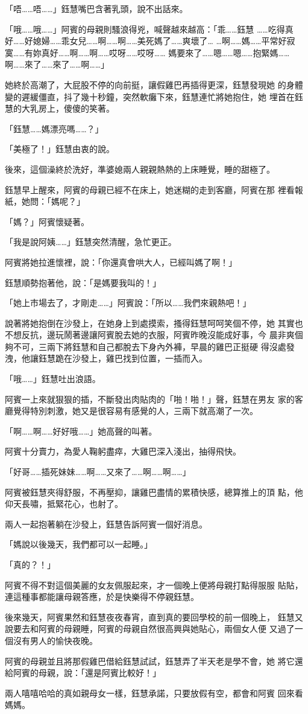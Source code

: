 「唔……唔……」鈺慧嘴巴含著乳頭，說不出話來。

「哦……哦……」阿賓的母親則騷浪得兇，喊聲越來越高：「乖……鈺慧
……吃得真好……好媳婦……乖女兒……啊……啊……美死媽了……爽壞了…
…啊……媽……平常好寂寞……有妳真好……啊……啊……哎呀……哎呀……
媽要來了……嗯……嗯……抱緊媽……啊……來了……來了……啊……」

她終於高潮了，大屁股不停的向前挺，讓假雞巴再插得更深，鈺慧發現她
的身體變的遲緩僵直，抖了幾十秒鐘，突然軟癱下來，鈺慧連忙將她抱住，她
埋首在鈺慧的大乳房上，傻傻的笑著。

「鈺慧……媽漂亮嗎……？」

「美極了！」鈺慧由衷的說。

後來，這個澡終於洗好，準婆媳兩人親親熱熱的上床睡覺，睡的甜極了。

鈺慧早上醒來，阿賓的母親已經不在床上，她迷糊的走到客廳，阿賓在那
裡看報紙，她問：「媽呢？」

「媽？」阿賓懷疑著。

「我是說阿姨……」鈺慧突然清醒，急忙更正。

阿賓將她拉進懷裡，說：「你還真會哄大人，已經叫媽了啊！」

鈺慧順勢抱著他，說：「是媽要我叫的！」

「她上市場去了，才剛走……」阿賓說：「所以……我們來親熱吧！」

說著將她抱倒在沙發上，在她身上到處摸索，搔得鈺慧呵呵笑個不停，她
其實也不想反抗，邊玩鬧著邊讓阿賓脫去她的衣服，阿賓昨晚沒能成好事，今
晨非爽個夠不可，三兩下將鈺慧和自己都脫去下身內外褲，早晨的雞巴正挺硬
得沒處發洩，他讓鈺慧跪在沙發上，雞巴找到位置，一插而入。

「哦……」鈺慧吐出浪語。

阿賓一上來就狠狠的插，不斷發出肉貼肉的「啪！啪！」聲，鈺慧在男友
家的客廳覺得特別刺激，她又是很容易有感覺的人，三兩下就高潮了一次。

「啊……啊……好好哦……」她高聲的叫著。

阿賓十分賣力，為愛人鞠躬盡瘁，大雞巴深入淺出，抽得飛快。

「好哥……插死妹妹……啊……又來了……啊……啊……」

阿賓被鈺慧夾得舒服，不再壓抑，讓雞巴盡情的累積快感，總算推上的頂
點，他仰天長嘯，抵緊花心，也射了。

兩人一起抱著躺在沙發上，鈺慧告訴阿賓一個好消息。

「媽說以後幾天，我們都可以一起睡。」

「真的？！」

阿賓不得不對這個美麗的女友佩服起來，才一個晚上便將母親打點得服服
貼貼，連這種事都能讓母親答應，於是快樂得不停親鈺慧。

後來幾天，阿賓果然和鈺慧夜夜春宵，直到真的要回學校的前一個晚上，
鈺慧又說要去和阿賓的母親睡，阿賓的母親自然很高興與她貼心，兩個女人便
又過了一個沒有男人的愉快夜晚。

阿賓的母親並且將那假雞巴借給鈺慧試試，鈺慧弄了半天老是學不會，她
將它還給阿賓的母親，說：「還是阿賓比較好！」

兩人嘻嘻哈哈的真如親母女一樣，鈺慧承諾，只要放假有空，都會和阿賓
回來看媽媽。










